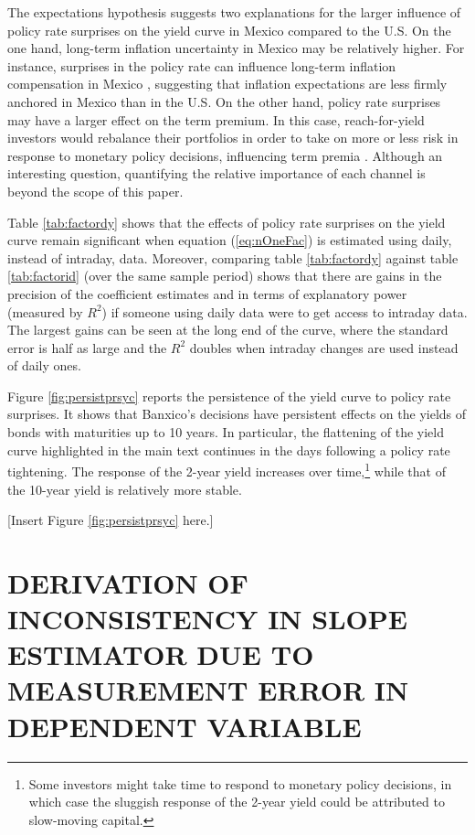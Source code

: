 \documentclass[a4paper,12pt]{article} 		%
\begin{document}
\begin{appendices}
The expectations hypothesis suggests two explanations for the larger influence of policy rate surprises on the yield curve in Mexico compared to the U.S. On the one hand, long-term inflation uncertainty in Mexico may be relatively higher. For instance, surprises in the policy rate can influence long-term inflation compensation in Mexico \parencite[][table 9]{DePooter_etal:2014}, suggesting that inflation expectations are less firmly anchored in Mexico than in the U.S. On the other hand, policy rate surprises may have a larger effect on the term premium. In this case, reach-for-yield investors would rebalance their portfolios in order to take on more or less risk in response to monetary policy decisions, influencing term premia \parencite{HansonStein:2015}. Although an interesting question, quantifying the relative importance of each channel is beyond the scope of this paper.

Table \ref{tab:factordy} shows that the effects of policy rate surprises on the yield curve remain significant when equation (\ref{eq:nOneFac}) is estimated using daily, instead of intraday, data. Moreover, comparing table \ref{tab:factordy} against table \ref{tab:factorid} (over the same sample period) shows that there are gains in the precision of the coefficient estimates and in terms of explanatory power (measured by \(R^2\)) if someone using daily data were to get access to intraday data. The largest gains can be seen at the long end of the curve, where the standard error is half as large and the \(R^2\) doubles when intraday changes are used instead of daily ones. 

Figure \ref{fig:persistprsyc} reports the persistence of the yield curve to policy rate surprises. It shows that Banxico's decisions have persistent effects on the yields of bonds with maturities up to 10 years. In particular, the flattening of the yield curve highlighted in the main text continues in the days following a policy rate tightening. The response of the 2-year yield increases over time,\footnote{Some investors might take time to respond to monetary policy decisions, in which case the sluggish response of the 2-year yield could be attributed to slow-moving capital.} while that of the 10-year yield is relatively more stable.

\begin{center}
	[Insert Figure \ref{fig:persistprsyc} here.]
\end{center}

\sectitlespace
\section{DERIVATION OF INCONSISTENCY IN SLOPE ESTIMATOR DUE TO MEASUREMENT ERROR IN DEPENDENT VARIABLE} \label{sec:plim}
\sectitlespace


\end{appendices}
\end{document}
